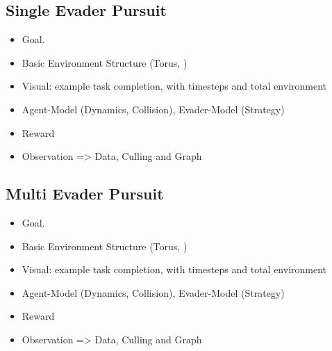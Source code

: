 \subsection{Single Evader Pursuit}
\begin{itemize}[noitemsep,nolistsep]
    \item Goal.
    \item Basic Environment Structure (Torus, )
    \item Visual: example task completion, with timesteps and total environment
    \item Agent-Model (Dynamics, Collision), Evader-Model (Strategy)
    \item Reward
    \item Observation => Data, Culling and Graph
\end{itemize} 

\subsection{Multi Evader Pursuit}
\begin{itemize}[noitemsep,nolistsep]
    \item Goal.
    \item Basic Environment Structure (Torus, )
    \item Visual: example task completion, with timesteps and total environment
    \item Agent-Model (Dynamics, Collision), Evader-Model (Strategy)
    \item Reward
    \item Observation => Data, Culling and Graph
\end{itemize} 


